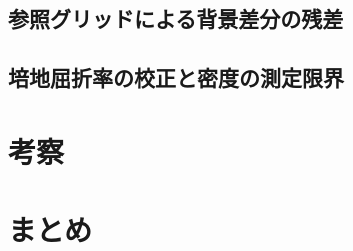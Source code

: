 \subsection{参照グリッドによる背景差分の残差}

\subsection{培地屈折率の校正と密度の測定限界}

\section{考察}
\label{sec:discussion}

\section{まとめ}
